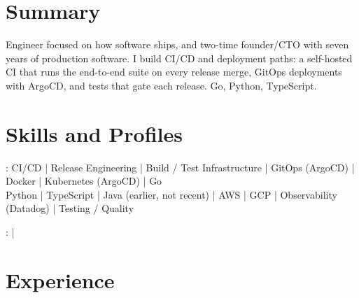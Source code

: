\documentclass[print]{jack-resume}
\begin{document}
\pagecolor{darkmodeBackground}


\begin{minipage}[t][1cm][t]{.03\textwidth}
    \hfill
\end{minipage}

\section{Summary}
Engineer focused on how software ships, and two-time founder/CTO with seven years of production software. I build CI/CD and deployment paths: a self-hosted CI that runs the end-to-end suite on every release merge, GitOps deployments with ArgoCD, and tests that gate each release. Go, Python, TypeScript.
\sectionsep

\section{Skills and Profiles}
:
CI/CD \hfill | \hfill
Release Engineering \hfill | \hfill
Build / Test Infrastructure \hfill | \hfill
GitOps (ArgoCD) \hfill | \hfill
Docker \hfill | \hfill
Kubernetes (ArgoCD) \hfill | \hfill
Go \\
\hspace{1.0cm} Python \hfill | \hfill
TypeScript \hfill | \hfill
Java (earlier, not recent) \hfill | \hfill
AWS \hfill | \hfill
GCP \hfill | \hfill
Observability (Datadog) \hfill | \hfill
Testing / Quality \\

\raggedright{
    :
      \href{https://www.linkedin.com/in/jack-sturtevant/}{ \ExternalLink} |
     \href{https://github.com/jacksturt}{ \ExternalLink}}

\section{Experience}
\end{document}
